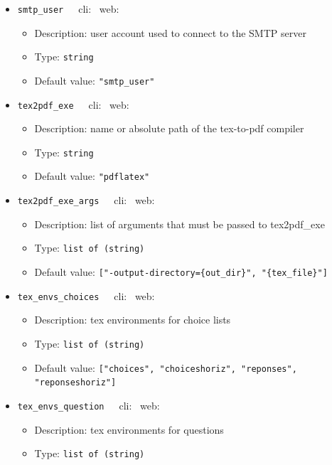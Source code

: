 {\begin{itemize}[itemsep=0pt,parsep=0pt,topsep=0pt,partopsep=0pt]
\begin{itemize}[itemsep=0pt,parsep=0pt,topsep=0pt,partopsep=0pt]
  \end{itemize}
\item{\tt{smtp\_user}}~~~cli: \xmark~web: \cmark
  \begin{itemize}[itemsep=0pt,parsep=0pt,topsep=0pt,partopsep=0pt]
  \item Description:  user account used to connect to the SMTP server
  \item Type:  {\tt{string}}
  \item Default value:  {\tt{"smtp\_user"}}
  \end{itemize}
\item{\tt{tex2pdf\_exe}}~~~cli: \cmark~web: \xmark
  \begin{itemize}[itemsep=0pt,parsep=0pt,topsep=0pt,partopsep=0pt]
  \item Description:  name or absolute path of the tex-to-pdf compiler
  \item Type:  {\tt{string}}
  \item Default value:  {\tt{"pdflatex"}}
  \end{itemize}
\item{\tt{tex2pdf\_exe\_args}}~~~cli: \cmark~web: \xmark
  \begin{itemize}[itemsep=0pt,parsep=0pt,topsep=0pt,partopsep=0pt]
  \item Description:  list of arguments that must be passed to tex2pdf\_exe
  \item Type:  {\tt{list of (string)}}
  \item Default value:  {\tt{["-output-directory=\{out\_dir\}", "\{tex\_file\}"]}}
  \end{itemize}
\item{\tt{tex\_envs\_choices}}~~~cli: \cmark~web: \xmark
  \begin{itemize}[itemsep=0pt,parsep=0pt,topsep=0pt,partopsep=0pt]
  \item Description:  tex environments for choice lists
  \item Type:  {\tt{list of (string)}}
  \item Default value:  {\tt{["choices", "choiceshoriz", "reponses", "reponseshoriz"]}}
  \end{itemize}
\item{\tt{tex\_envs\_question}}~~~cli: \cmark~web: \xmark
  \begin{itemize}[itemsep=0pt,parsep=0pt,topsep=0pt,partopsep=0pt]
  \item Description:  tex environments for questions
  \item Type:  {\tt{list of (string)}}

\end{itemize}
\end{itemize}}
